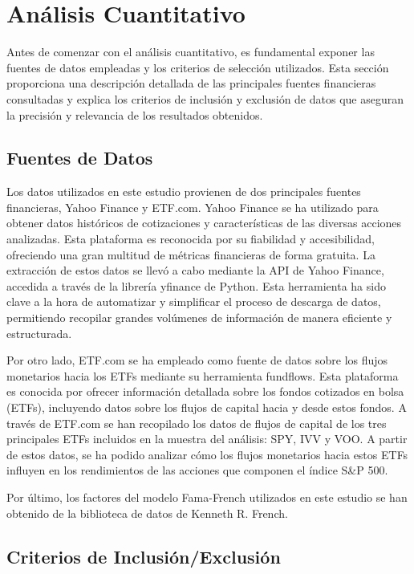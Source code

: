 \documentclass[12pt,a4paper]{article}
\begin{document}
\newpage

\section{Análisis Cuantitativo}

Antes de comenzar con el análisis cuantitativo, es fundamental exponer las fuentes de datos empleadas y los criterios de selección utilizados. Esta sección proporciona una descripción detallada de las principales fuentes financieras consultadas y explica los criterios de inclusión y exclusión de datos que aseguran la precisión y relevancia de los resultados obtenidos.

\subsection*{Fuentes de Datos}

Los datos utilizados en este estudio provienen de dos principales fuentes financieras, Yahoo Finance y ETF.com. Yahoo Finance se ha utilizado para obtener datos históricos de cotizaciones y características de las diversas acciones analizadas. Esta plataforma es reconocida por su fiabilidad y accesibilidad, ofreciendo una gran multitud de métricas financieras de forma gratuita. La extracción de estos datos se llevó a cabo mediante la API de Yahoo Finance, accedida a través de la librería yfinance de Python. Esta herramienta ha sido clave a la hora de automatizar y simplificar el proceso de descarga de datos, permitiendo recopilar grandes volúmenes de información de manera eficiente y estructurada.

Por otro lado, ETF.com se ha empleado como fuente de datos sobre los flujos monetarios hacia los ETFs mediante su herramienta fundflows. Esta plataforma es conocida por ofrecer información detallada sobre los fondos cotizados en bolsa (ETFs), incluyendo datos sobre los flujos de capital hacia y desde estos fondos. A través de ETF.com se han recopilado los datos de flujos de capital de los tres principales ETFs incluidos en la muestra del análisis: SPY, IVV y VOO. A partir de estos datos, se ha podido analizar cómo los flujos monetarios hacia estos ETFs influyen en los rendimientos de las acciones que componen el índice S\&P 500.

Por último, los factores del modelo Fama-French utilizados en este estudio se han obtenido de la biblioteca de datos de Kenneth R. French.

\subsection*{Criterios de Inclusión/Exclusión}
\end{document}
